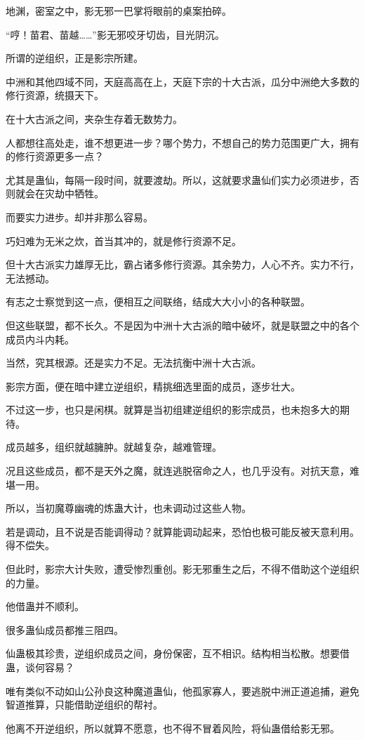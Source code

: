 \begin{this_body}
地渊，密室之中，影无邪一巴掌将眼前的桌案拍碎。

“哼！苗君、苗越……”影无邪咬牙切齿，目光阴沉。

所谓的逆组织，正是影宗所建。

中洲和其他四域不同，天庭高高在上，天庭下宗的十大古派，瓜分中洲绝大多数的修行资源，统摄天下。

在十大古派之间，夹杂生存着无数势力。

人都想往高处走，谁不想更进一步？哪个势力，不想自己的势力范围更广大，拥有的修行资源更多一点？

尤其是蛊仙，每隔一段时间，就要渡劫。所以，这就要求蛊仙们实力必须进步，否则就会在灾劫中牺牲。

而要实力进步。却并非那么容易。

巧妇难为无米之炊，首当其冲的，就是修行资源不足。

但十大古派实力雄厚无比，霸占诸多修行资源。其余势力，人心不齐。实力不行，无法撼动。

有志之士察觉到这一点，便相互之间联络，结成大大小小的各种联盟。

但这些联盟，都不长久。不是因为中洲十大古派的暗中破坏，就是联盟之中的各个成员内斗内耗。

当然，究其根源。还是实力不足。无法抗衡中洲十大古派。

影宗方面，便在暗中建立逆组织，精挑细选里面的成员，逐步壮大。

不过这一步，也只是闲棋。就算是当初组建逆组织的影宗成员，也未抱多大的期待。

成员越多，组织就越臃肿。就越复杂，越难管理。

况且这些成员，都不是天外之魔，就连逃脱宿命之人，也几乎没有。对抗天意，难堪一用。

所以，当初魔尊幽魂的炼蛊大计，也未调动过这些人物。

若是调动，且不说是否能调得动？就算能调动起来，恐怕也极可能反被天意利用。得不偿失。

但此时，影宗大计失败，遭受惨烈重创。影无邪重生之后，不得不借助这个逆组织的力量。

他借蛊并不顺利。

很多蛊仙成员都推三阻四。

仙蛊极其珍贵，逆组织成员之间，身份保密，互不相识。结构相当松散。想要借蛊，谈何容易？

唯有类似不动如山公孙良这种魔道蛊仙，他孤家寡人，要逃脱中洲正道追捕，避免智道推算，只能借助逆组织的帮衬。

他离不开逆组织，所以就算不愿意，也不得不冒着风险，将仙蛊借给影无邪。


\end{this_body}
